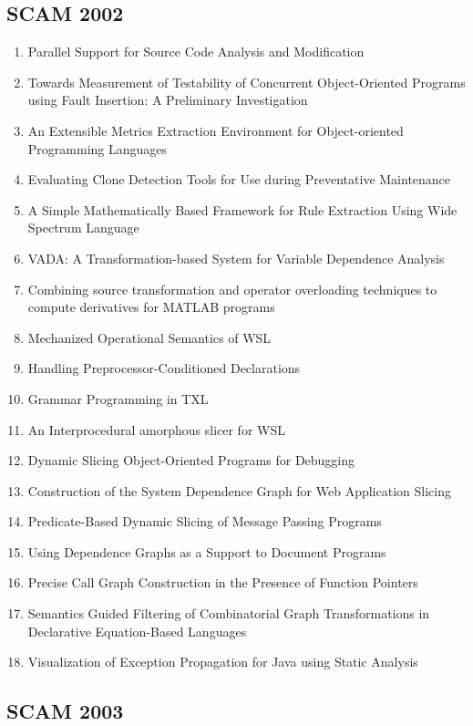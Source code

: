 \subsection{SCAM 2002}

\begin{enumerate}[itemsep=-1ex]
  \item Parallel Support for Source Code Analysis and Modification
  \item Towards Measurement of Testability of Concurrent Object-Oriented Programs using Fault Insertion: A Preliminary Investigation
  \item An Extensible Metrics Extraction Environment for Object-oriented Programming Languages
  \item Evaluating Clone Detection Tools for Use during Preventative Maintenance
  \item A Simple Mathematically Based Framework for Rule Extraction Using Wide Spectrum Language
  \item VADA: A Transformation-based System for Variable Dependence Analysis
  \item Combining source transformation and operator overloading techniques to compute derivatives for MATLAB programs
  \item Mechanized Operational Semantics of WSL
  \item Handling Preprocessor-Conditioned Declarations
  \item Grammar Programming in TXL
  \item An Interprocedural amorphous slicer for WSL
  \item Dynamic Slicing Object-Oriented Programs for Debugging
  \item Construction of the System Dependence Graph for Web Application Slicing
  \item Predicate-Based Dynamic Slicing of Message Passing Programs
  \item Using Dependence Graphs as a Support to Document Programs
  \item Precise Call Graph Construction in the Presence of Function Pointers
  \item Semantics Guided Filtering of Combinatorial Graph Transformations in Declarative Equation-Based Languages
  \item Visualization of Exception Propagation for Java using Static Analysis
\end{enumerate}

\subsection{SCAM 2003}


